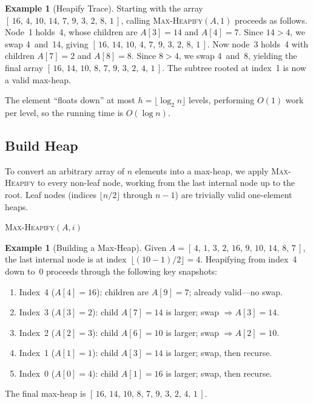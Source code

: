 \documentclass[11pt, a4paper, notitlepage]{report}
\theoremstyle{definition}
\theoremstyle{remark}
\theoremstyle{definition}
\newtheorem{example}[theorem]{Example}
\begin{document}
\begin{example}[Heapify Trace]
\label{ex:heapify-trace}
Starting with the array $[\,16,\,4,\,10,\,14,\,7,\,9,\,3,\,2,\,8,\,1\,]$, calling \textsc{Max-Heapify}$(A,1)$ proceeds as follows.  Node~1 holds~4, whose children are $A[3]=14$ and $A[4]=7$.  Since $14>4$, we swap 4~and~14, giving $[\,16,\,14,\,10,\,4,\,7,\,9,\,3,\,2,\,8,\,1\,]$.  Now node~3 holds~4 with children $A[7]=2$ and $A[8]=8$.  Since $8>4$, we swap 4~and~8, yielding the final array $[\,16,\,14,\,10,\,8,\,7,\,9,\,3,\,2,\,4,\,1\,]$.  The subtree rooted at index~1 is now a valid max-heap.
\end{example}

The element ``floats down'' at most $h=\lfloor\log_2 n\rfloor$ levels, performing $O(1)$ work per level, so the running time is $O(\log n)$.

\subsection{Build Heap}
\label{subsec:build-heap}

To convert an arbitrary array of $n$ elements into a max-heap, we apply \textsc{Max-Heapify} to every non-leaf node, working from the last internal node up to the root.  Leaf nodes (indices $\lfloor n/2\rfloor$ through $n-1$) are trivially valid one-element heaps.

\begin{algorithm}[h]
\caption{\textsc{Build-Max-Heap}$(A)$}
\label{alg:build-heap}
\begin{algorithmic}[1]
    \State \textsc{Max-Heapify}$(A, i)$
\EndFor
\end{algorithmic}
\end{algorithm}

\begin{example}[Building a Max-Heap]
\label{ex:build-heap}
Given $A = [\,4,\,1,\,3,\,2,\,16,\,9,\,10,\,14,\,8,\,7\,]$, the last internal node is at index~$\lfloor(10-1)/2\rfloor = 4$.  Heapifying from index~4 down to~0 proceeds through the following key snapshots:
\begin{enumerate}
  \item Index~4 ($A[4]=16$): children are $A[9]=7$; already valid---no swap.
  \item Index~3 ($A[3]=2$): child $A[7]=14$ is larger; swap $\Rightarrow A[3]=14$.
  \item Index~2 ($A[2]=3$): child $A[6]=10$ is larger; swap $\Rightarrow A[2]=10$.
  \item Index~1 ($A[1]=1$): child $A[3]=14$ is larger; swap, then recurse.
  \item Index~0 ($A[0]=4$): child $A[1]=16$ is larger; swap, then recurse.
\end{enumerate}
The final max-heap is $[\,16,\,14,\,10,\,8,\,7,\,9,\,3,\,2,\,4,\,1\,]$.
\end{example}
\end{document}
